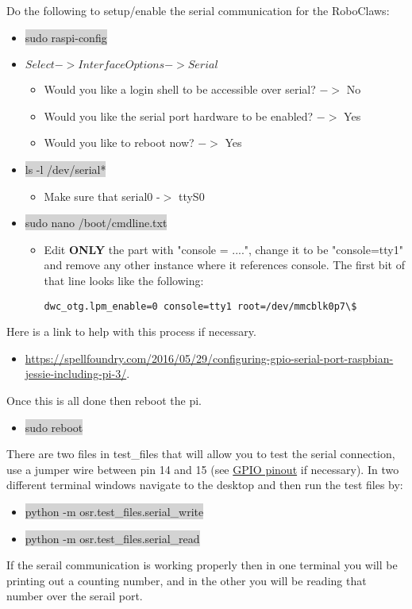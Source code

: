 \documentclass[12pt]{article}
\begin{document}
\noindent Do the following to setup/enable the serial communication for the RoboClaws:
\begin{itemize}
	\item[] \colorbox{lightgray}{sudo raspi-config}	
	\item[]  $Select -> Interface Options -> Serial $
	\begin{itemize}
		\item Would you like a login shell to be accessible over serial? $->$ No
		\item Would you like the serial port hardware to be enabled? $->$ Yes
		\item Would you like to reboot now? $->$ Yes
	\end{itemize} 
	\item[] \colorbox{lightgray}{ls -l /dev/serial*}
	\begin{itemize}
		\item Make sure that serial0 -$>$ ttyS0
	\end{itemize}
	\item [] \colorbox{lightgray}{sudo nano /boot/cmdline.txt}
	\begin{itemize}
		\item Edit \textbf{ONLY} the part with "console = ....", change it to be "console=tty1" and remove any other instance where it references console. The first bit of that line looks like the following:
\begin{verbatim}
dwc_otg.lpm_enable=0 console=tty1 root=/dev/mmcblk0p7\$
\end{verbatim}  
	\end{itemize}	
\end{itemize}




\noindent Here is a link to help with this process if necessary.
\begin{itemize}
	\item \href{https://spellfoundry.com/2016/05/29/configuring-gpio-serial-port-raspbian-jessie-including-pi-3/}{https://spellfoundry.com/2016/05/29/configuring-gpio-serial-port-raspbian-jessie-including-pi-3/}. 
\end{itemize}
\noindent Once this is all done then reboot the pi.
\begin{itemize}
	\item[] \colorbox{lightgray}{sudo reboot}
\end{itemize}

\bigskip
There are two files in test\_files that will allow you to test the serial connection, use a jumper wire between pin 14 and 15 (see \href{https://www.raspberrypi.org/documentation/usage/gpio-plus-and-raspi2/}{GPIO pinout} if necessary). In two different terminal windows navigate to the desktop and then run the test files by:
\begin{itemize}
	\item[] \colorbox{lightgray}{python -m osr.test\_files.serial\_write}  
	\item[] \colorbox{lightgray}{python -m osr.test\_files.serial\_read}
\end{itemize}

If the serail communication is working properly then in one terminal you will be printing out a counting number, and in the other you will be reading that number over the serail port. 

\newpage
\end{document}

